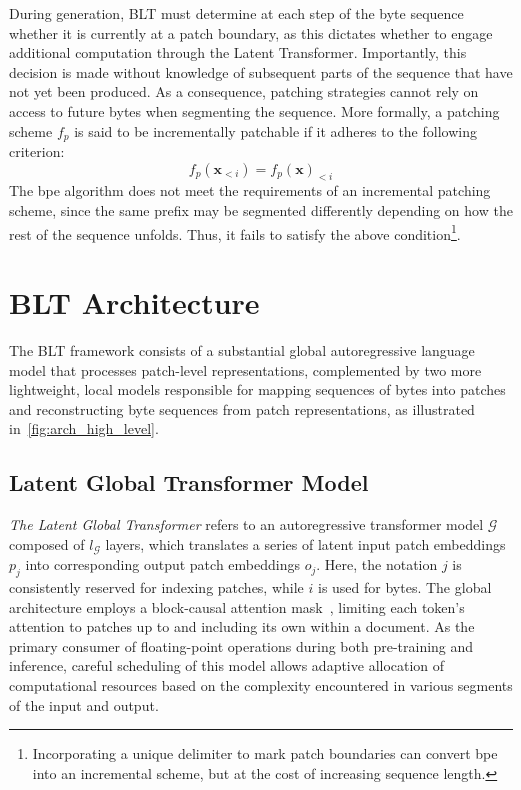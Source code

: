 During generation, {\textsc BLT} must determine at each step of the byte sequence whether it is currently at a patch boundary, as this dictates whether to engage additional computation through the Latent Transformer. Importantly, this decision is made without knowledge of subsequent parts of the sequence that have not yet been produced. As a consequence, patching strategies cannot rely on access to future bytes when segmenting the sequence. More formally, a patching scheme $f_p$ is said to be incrementally patchable if it adheres to the following criterion:
$$f_p(\pmb{x}_{<i}) = f_p(\pmb{x})_{<i}$$
The bpe algorithm does not meet the requirements of an incremental patching scheme, since the same prefix may be segmented differently depending on how the rest of the sequence unfolds. Thus, it fails to satisfy the above condition\footnote{Incorporating a unique delimiter to mark patch boundaries can convert bpe into an incremental scheme, but at the cost of increasing sequence length.}.

\section{{\textsc BLT} Architecture}
\label{section:architecture}
The {\textsc BLT} framework consists of a substantial global autoregressive language model that processes patch-level representations, complemented by two more lightweight, local models responsible for mapping sequences of bytes into patches and reconstructing byte sequences from patch representations, as illustrated in~\autoref{fig:arch_high_level}.

\subsection{Latent Global Transformer Model}

\textit{The Latent Global Transformer} refers to an autoregressive transformer model $\mathcal{G}$ composed of $l_{\mathcal{G}}$ layers, which translates a series of latent input patch embeddings $p_j$ into corresponding output patch embeddings $o_j$. Here, the notation $j$ is consistently reserved for indexing patches, while $i$ is used for bytes. The global architecture employs a block-causal attention mask~\citep{dubey2024llama}, limiting each token's attention to patches up to and including its own within a document. As the primary consumer of floating-point operations during both pre-training and inference, careful scheduling of this model allows adaptive allocation of computational resources based on the complexity encountered in various segments of the input and output.

